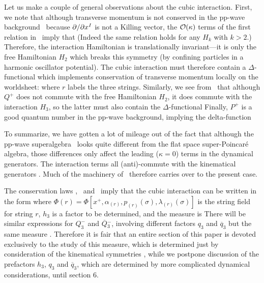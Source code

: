 Let us make a couple of general observations about
the cubic interaction.
First, we note that
although transverse momentum is not conserved in the pp-wave
background \ppsol\ because $\partial/\partial x^I$ is not a Killing vector,
the
${\cal{O}}(\kappa)$ terms of the first relation in
\superone\ imply that
\eqn{}
(Indeed the same relation holds for any $H_k$ with  $k>2$.)
Therefore,
the interaction Hamiltonian is translationally invariant---it is
only the free Hamiltonian $H_2$ which breaks this symmetry
(by confining particles in a harmonic oscillator potential).
The cubic interaction must therefore contain a $\Delta$-functional
which implements conservation of transverse momentum locally on the
worldsheet:
\eqn\aone{
\Delta^8 \left[ \sum_{r=1}^3 p^I_{(r)} (\sigma)\right],
}
where $r$ labels the three strings.
Similarly,
we see from \superone\ that
although $Q^+$ does not commute with the free Hamiltonian $H_2$,
it does commute with the interaction $H_3$, so the latter must
also contain the $\Delta$-functional
\eqn{}
Finally, $P^+$ is a good quantum number in the pp-wave background,
implying the delta-function
\eqn{}

To summarize, we have gotten a lot of mileage out of the fact that
although the pp-wave superalgebra \superone\ looks quite different from
the flat space super-Poincar\'e algebra, those differences only
affect the leading ($\kappa = 0$) terms in the dynamical generators.
The interaction terms all (anti)-commute with the kinematical
generators \kine.  Much of the machinery of \GSB\ therefore
carries over to the present case.


The conservation laws \aone, \atwo\ and \athree\ imply that the
cubic interaction can be written in the form
\eqn{}
where $\Phi(r) = \Phi[x^+, \alpha_{(r)}, p_{(r)}(\sigma),
\lambda_{(r)}(\sigma)]$ is the string
field for string $r$, $h_3$ is a factor to be determined, and
the measure is
\eqn{}
There will be similar expressions for $Q^-_3$ and $\overline{Q}{}^-_3$,
involving different factors $q_3$ and $\overline{q}_3$
but the same measure \measure.  Therefore it
is fair that an entire section of this paper
is devoted exclusively to the study of this measure, which
is determined just by consideration of the kinematical symmetries
\kine, while we postpone
discussion of the prefactors $h_3$, $q_3$ and $\overline{q}_3$,
which are determined by more complicated dynamical considerations, until
section 6.


